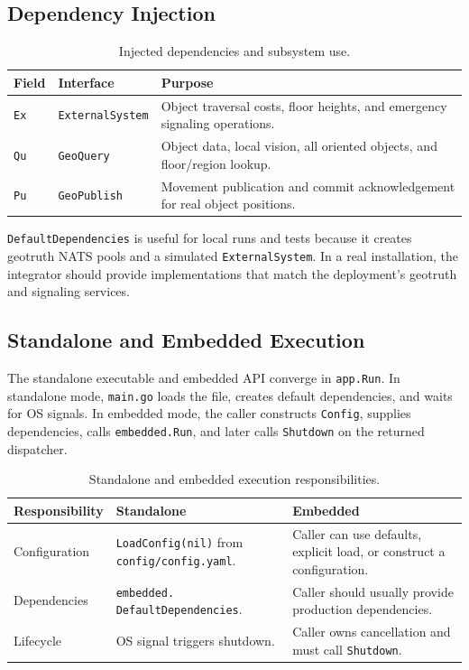 \documentclass[12pt,a4paper]{report}
\begin{document}
\subsection{Dependency Injection}

\begin{table}[H]
\centering
\begin{tabular}{|p{}|p{}|p{}|}
\hline
\textbf{Field} & \textbf{Interface} & \textbf{Purpose} \\
\hline
\texttt{Ex} &
\texttt{ExternalSystem} &
Object traversal costs, floor heights, and emergency signaling operations. \\
\hline
\texttt{Qu} &
\texttt{GeoQuery} &
Object data, local vision, all oriented objects, and floor/region lookup. \\
\hline
\texttt{Pu} &
\texttt{GeoPublish} &
Movement publication and commit acknowledgement for real object positions. \\
\hline
\end{tabular}
\caption{Injected dependencies and subsystem use.}
\end{table}

\texttt{DefaultDependencies} is useful for local runs and tests because it
creates geotruth NATS pools and a simulated \texttt{ExternalSystem}. In a real
installation, the integrator should provide implementations that match the
deployment's geotruth and signaling services.

\subsection{Standalone and Embedded Execution}

The standalone executable and embedded API converge in \texttt{app.Run}. In
standalone mode, \texttt{main.go} loads the file, creates default dependencies,
and waits for OS signals. In embedded mode, the caller constructs
\texttt{Config}, supplies dependencies, calls \texttt{embedded.Run}, and later
calls \texttt{Shutdown} on the returned dispatcher.

\begin{table}[H]
\centering
\begin{tabular}{|p{}|p{}|p{}|}
\hline
\textbf{Responsibility} & \textbf{Standalone} & \textbf{Embedded} \\
\hline
Configuration &
\texttt{LoadConfig(nil)} from \texttt{config/config.yaml}. &
Caller can use defaults, explicit load, or construct a configuration. \\
\hline
Dependencies &
\texttt{embedded.} \newline \texttt{DefaultDependencies}. &
Caller should usually provide production dependencies. \\
\hline
Lifecycle &
OS signal triggers shutdown. &
Caller owns cancellation and must call \texttt{Shutdown}. \\
\hline
\end{tabular}
\caption{Standalone and embedded execution responsibilities.}
\end{table}
\end{document}
